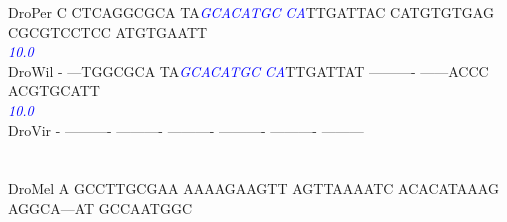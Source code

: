 \documentclass[11pt,twoside,reqno,a4paper]{article}
\begin{document}
{DroPer	C	CTCAGGCGCA	TA\textit{\textcolor{Blue}{G}}\textit{\textcolor{Blue}{C}}\textit{\textcolor{Blue}{A}}\textit{\textcolor{Blue}{C}}\textit{\textcolor{Blue}{A}}\textit{\textcolor{Blue}{T}}\textit{\textcolor{Blue}{G}}\textit{\textcolor{Blue}{C}}	\textit{\textcolor{Blue}{C}}\textit{\textcolor{Blue}{A}}TTGATTAC	CATGTGTGAG	CGCGTCCTCC	ATGTGAATT\\
\hspace*{7\charwidth}\hspace*{1\charwidth}\hspace*{1\charwidth}\hspace*{13\charwidth}\textit{\textcolor{Blue}{10.0}}\hspace*{1\charwidth}\hspace*{1\charwidth}\hspace*{1\charwidth}\hspace*{1\charwidth}\\
DroWil	-	---TGGCGCA	TA\textit{\textcolor{Blue}{G}}\textit{\textcolor{Blue}{C}}\textit{\textcolor{Blue}{A}}\textit{\textcolor{Blue}{C}}\textit{\textcolor{Blue}{A}}\textit{\textcolor{Blue}{T}}\textit{\textcolor{Blue}{G}}\textit{\textcolor{Blue}{C}}	\textit{\textcolor{Blue}{C}}\textit{\textcolor{Blue}{A}}TTGATTAT	----------	------ACCC	ACGTGCATT\\
\hspace*{7\charwidth}\hspace*{1\charwidth}\hspace*{1\charwidth}\hspace*{13\charwidth}\textit{\textcolor{Blue}{10.0}}\hspace*{1\charwidth}\hspace*{1\charwidth}\hspace*{1\charwidth}\hspace*{1\charwidth}\\
DroVir	-	----------	----------	----------	----------	----------	---------\\
\hspace*{7\charwidth}\hspace*{1\charwidth}\hspace*{1\charwidth}\hspace*{1\charwidth}\hspace*{1\charwidth}\hspace*{1\charwidth}\hspace*{1\charwidth}\\
\\
DroMel	A	GCCTTGCGAA	AAAAGAAGTT	AGTTAAAATC	ACACATAAAG	AGGCA---AT	GCCAATGGC\\
}
\end{document}
